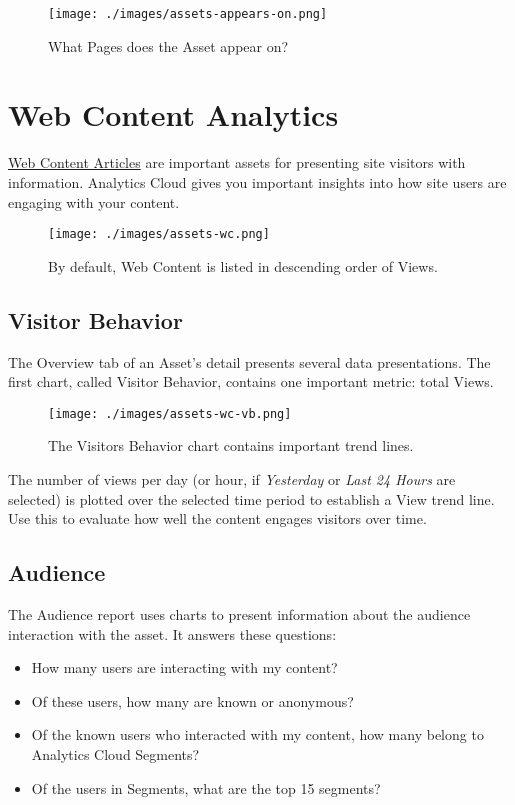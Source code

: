 \begin{figure}
\centering
\texttt{[image: ./images/assets-appears-on.png]}
\caption{What Pages does the Asset appear on?}
\end{figure}

\section{Web Content Analytics}\label{web-content-analytics}

\href{/docs/7-1/user/-/knowledge_base/u/introduction-web-content}{Web
Content Articles} are important assets for presenting site visitors with
information. Analytics Cloud gives you important insights into how site
users are engaging with your content.

\begin{figure}
\centering
\texttt{[image: ./images/assets-wc.png]}
\caption{By default, Web Content is listed in descending order of
Views.}
\end{figure}

\subsection{Visitor Behavior}\label{visitor-behavior-4}

The Overview tab of an Asset's detail presents several data
presentations. The first chart, called Visitor Behavior, contains one
important metric: total Views.

\begin{figure}
\centering
\texttt{[image: ./images/assets-wc-vb.png]}
\caption{The Visitors Behavior chart contains important trend lines.}
\end{figure}

The number of views per day (or hour, if \emph{Yesterday} or \emph{Last
24 Hours} are selected) is plotted over the selected time period to
establish a View trend line. Use this to evaluate how well the content
engages visitors over time.

\subsection{Audience}\label{audience-4}

The Audience report uses charts to present information about the
audience interaction with the asset. It answers these questions:

\begin{itemize}
\tightlist
\item
  How many users are interacting with my content?
\item
  Of these users, how many are known or anonymous?
\item
  Of the known users who interacted with my content, how many belong to
  Analytics Cloud Segments?
\item
  Of the users in Segments, what are the top 15 segments?
\end{itemize}

